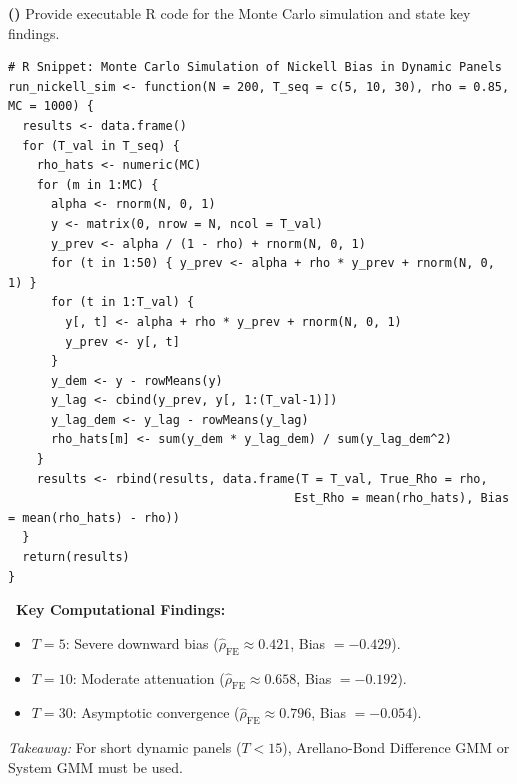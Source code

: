 \documentclass[11pt,a4paper]{article}
\newcounter{subprob}[section]
\newcommand{\subproblem}[1]{%
    \par\vspace{2pt}\noindent%
    \refstepcounter{subprob}%
    \textbf{\sffamily\color{NavyPrimary}(\alph{subprob})} #1\par\vspace{1pt}%
}
\begin{document}
\setcounter{subprob}{0}

\subproblem{Provide executable R code for the Monte Carlo simulation and state key findings.}

\begin{tcolorbox}[codebox]
\begin{verbatim}
# R Snippet: Monte Carlo Simulation of Nickell Bias in Dynamic Panels
run_nickell_sim <- function(N = 200, T_seq = c(5, 10, 30), rho = 0.85, MC = 1000) {
  results <- data.frame()
  for (T_val in T_seq) {
    rho_hats <- numeric(MC)
    for (m in 1:MC) {
      alpha <- rnorm(N, 0, 1)
      y <- matrix(0, nrow = N, ncol = T_val)
      y_prev <- alpha / (1 - rho) + rnorm(N, 0, 1)
      for (t in 1:50) { y_prev <- alpha + rho * y_prev + rnorm(N, 0, 1) }
      for (t in 1:T_val) {
        y[, t] <- alpha + rho * y_prev + rnorm(N, 0, 1)
        y_prev <- y[, t]
      }
      y_dem <- y - rowMeans(y)
      y_lag <- cbind(y_prev, y[, 1:(T_val-1)])
      y_lag_dem <- y_lag - rowMeans(y_lag)
      rho_hats[m] <- sum(y_dem * y_lag_dem) / sum(y_lag_dem^2)
    }
    results <- rbind(results, data.frame(T = T_val, True_Rho = rho, 
                                        Est_Rho = mean(rho_hats), Bias = mean(rho_hats) - rho))
  }
  return(results)
}
\end{verbatim}
\end{tcolorbox}

\begin{tcolorbox}[infobox]
\sffamily
\textbf{\faCheckCircle\ Key Computational Findings:}
\begin{itemize}[leftmargin=14pt, topsep=1pt, itemsep=1pt]
    \item \textbf{$T = 5$}: Severe downward bias ($\hat{\rho}_{\text{FE}} \approx 0.421$, Bias $= -0.429$).
    \item \textbf{$T = 10$}: Moderate attenuation ($\hat{\rho}_{\text{FE}} \approx 0.658$, Bias $= -0.192$).
    \item \textbf{$T = 30$}: Asymptotic convergence ($\hat{\rho}_{\text{FE}} \approx 0.796$, Bias $= -0.054$).
\end{itemize}
\textit{Takeaway:} For short dynamic panels ($T < 15$), Arellano-Bond Difference GMM or System GMM must be used.
\end{tcolorbox}
\end{document}
